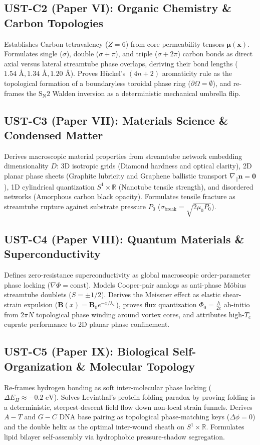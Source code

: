 \documentclass[11pt,a4paper]{article}
\begin{document}
	\subsection{UST-C2 (Paper VI): Organic Chemistry \& Carbon Topologies}
	Establishes Carbon tetravalency ($Z=6$) from core permeability tensors $\boldsymbol{\mu}(\mathbf{x})$. Formulates single ($\sigma$), double ($\sigma+\pi$), and triple ($\sigma+2\pi$) carbon bonds as direct axial versus lateral streamtube phase overlaps, deriving their bond lengths ($1.54 \text{ \AA}, 1.34 \text{ \AA}, 1.20 \text{ \AA}$). Proves Hückel's $(4n+2)$ aromaticity rule as the topological formation of a boundaryless toroidal phase ring ($\partial \Omega = \emptyset$), and re-frames the $\text{S}_\text{N}2$ Walden inversion as a deterministic mechanical umbrella flip.
	
	\subsection{UST-C3 (Paper VII): Materials Science \& Condensed Matter}
	Derives macroscopic material properties from streamtube network embedding dimensionality $D$: 3D isotropic grids (Diamond hardness and optical clarity), 2D planar phase sheets (Graphite lubricity and Graphene ballistic transport $\nabla_{\parallel} \mathbf{n} = \mathbf{0}$), 1D cylindrical quantization $S^1 \times \mathbb{R}$ (Nanotube tensile strength), and disordered networks (Amorphous carbon black opacity). Formulates tensile fracture as streamtube rupture against substrate pressure $P_0$ ($\sigma_{\text{break}} = \sqrt{2\mu_0 P_0}$).
	
	\subsection{UST-C4 (Paper VIII): Quantum Materials \& Superconductivity}
	Defines zero-resistance superconductivity as global macroscopic order-parameter phase locking ($\nabla \Phi = \text{const}$). Models Cooper-pair analogs as anti-phase Möbius streamtube doublets ($S = \pm 1/2$). Derives the Meissner effect as elastic shear-strain expulsion ($\mathbf{B}(x) = \mathbf{B}_0 e^{-x/\lambda_L}$), proves flux quantization $\Phi_0 = \frac{h}{2e}$ ab-initio from $2\pi N$ topological phase winding around vortex cores, and attributes high-$T_c$ cuprate performance to 2D planar phase confinement.
	
	\subsection{UST-C5 (Paper IX): Biological Self-Organization \& Molecular Topology}
	Re-frames hydrogen bonding as soft inter-molecular phase locking ($\Delta E_H \approx -0.2 \text{ eV}$). Solves Levinthal's protein folding paradox by proving folding is a deterministic, steepest-descent field flow down non-local strain funnels. Derives $A-T$ and $G-C$ DNA base pairing as topological phase-matching keys ($\Delta \phi = 0$) and the double helix as the optimal inter-wound sheath on $S^1 \times \mathbb{R}$. Formulates lipid bilayer self-assembly via hydrophobic pressure-shadow segregation.
	
\end{document}
